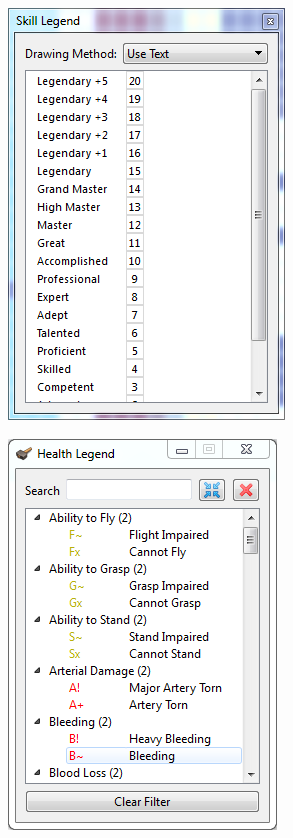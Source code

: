 \documentclass[]{article}
\begin{document}
\begin{itemize}
\begin{figure}[h!]
        \centering
        \begin{subfigure}[C]{0.5\linewidth}
                \centering
                \includegraphics[width=.75\textwidth]{Sec1Fig16-4}
        \end{subfigure}
        \begin{subfigure}[C]{0.45\linewidth}
                \centering
                \includegraphics[width=.8\textwidth]{Sec1Fig16-3}

\end{subfigure}
\end{figure}
\end{itemize}
\end{document}
